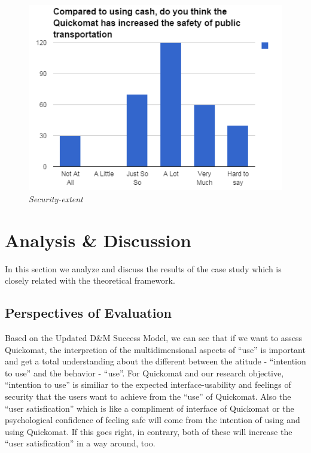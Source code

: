 \documentclass[twocolumn]{article}
\begin{document}
\begin{figure}
  \centering
  \includegraphics[width=\columnwidth]{fig/security-extent.png}
  \caption{\emph{Security-extent}}
  \label{fig:security-extent}
\end{figure}



\section{Analysis \& Discussion}
In this section we analyze and discuss the results of the case study which is closely related with the theoretical framework.

\subsection{Perspectives of Evaluation}
Based on the Updated D\&M Success Model, we can see that if we want to assess Quickomat, the interpretion of the multidimensional aspects of “use” is important and get a total understanding about the different between the atitude - “intention to use” and the behavior - “use”. For Quickomat and our research objective, “intention to use” is similiar to the expected interface-usability and feelings of security that the users want to achieve from the “use” of Quickomat. Also the “user satisfication” which is like a compliment of interface of Quickomat or the psychological confidence of feeling safe will come from the intention of using and using Quickomat. If this goes right, in contrary, both of these will increase the “user satisfication” in a way around, too.  
\end{document}
